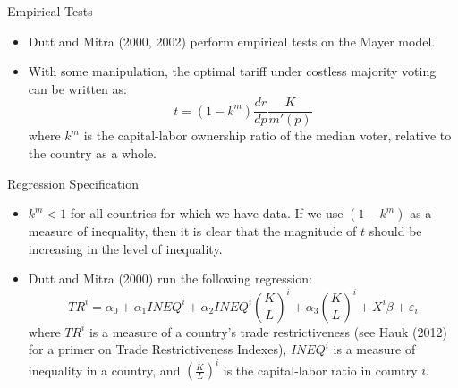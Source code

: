 \documentclass[aspectratio=169]{beamer}
\begin{document}
\begin{frame}{Empirical Tests}

\begin{itemize}
    \item<1-> Dutt and Mitra (2000, 2002) perform empirical tests on the Mayer model.
    \item<2-> With some manipulation, the optimal tariff under costless majority voting can be written as: \begin{equation*}
        t = \left( 1- k^{m} \right) \frac{dr}{dp} \frac{K}{m'\left( p \right)}
    \end{equation*}
    where $ k^{m} $ is the capital-labor ownership ratio of the median voter, relative to the country as a whole.
\end{itemize}
    
\end{frame}


\begin{frame}{Regression Specification}

\begin{itemize}
    \item<1-> $ k^{m} < 1 $ for all countries for which we have data.  If we use $ \left( 1 - k^{m} \right) $ as a measure of inequality, then it is clear that the magnitude of $ t $ should be increasing in the level of inequality.
    \item<2-> Dutt and Mitra (2000) run the following regression:
    \begin{equation*}
        TR^{i} = \alpha_{0} + \alpha_{1} INEQ^{i} + \alpha_{2} INEQ^{i} \left( \frac{K}{L} \right)^{i} + \alpha_{3} \left( \frac{K}{L} \right)^{i} + X^{i}\beta + \varepsilon_{i}
    \end{equation*}
    where $ TR^{i} $ is a measure of a country's trade restrictiveness (see Hauk (2012) for a primer on Trade Restrictiveness Indexes), $ INEQ^{i} $ is a measure of inequality in a country, and $ \left( \frac{K}{L} \right)^{i}$ is the capital-labor ratio in country $ i $.
\end{itemize}
    
\end{frame}

\end{document}
